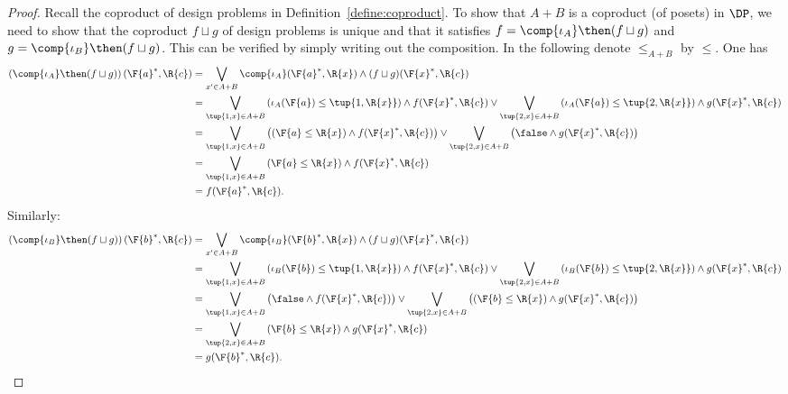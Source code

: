 \begin{proof}
Recall the coproduct of design problems in Definition~\ref{define:coproduct}. To show that $A+B$ is a coproduct (of posets) in $\DP$, we need to show that the coproduct $f \sqcup g$ of design problems is unique and that it satisfies $f = \comp{\iota_A} \then (f \sqcup g)$ and $g = \comp{\iota_B} \then (f \sqcup g)$. This can be verified by simply writing out the composition. In the following denote $\leq_{A+B}$ by $\leq$. One has
\begin{equation}
    \begin{aligned}
    \left(\comp{\iota_A}\then (f\sqcup g)\right)(\F{a}^*,\R{c})&=\bigvee_{x' \in A+B}\comp{\iota_A}(\F{a}^*,\R{x})\wedge (f\sqcup g)(\F{x}^*,\R{c})\\
    &=\bigvee_{\tup{1,x} \in A+B}
    \left(\iota_A(\F{a})\leq\tup{1,\R{x}}\right)\wedge  f(\F{x}^*,\R{c})  \vee \bigvee_{\tup{2,x} \in A+B}
    \left(\iota_A(\F{a})\leq \tup{2,\R{x}}\right)\wedge  g(\F{x}^*,\R{c})\\
    &=\bigvee_{\tup{1,x} \in A+B}
    \left( \left(\F{a}\leq \R{x}\right) \wedge  f(\F{x}^*,\R{c})\right) \vee \bigvee_{\tup{2,x} \in A+B}
    \left( \false \wedge  g(\F{x}^*,\R{c}) \right)\\
    &=\bigvee_{\tup{1,x} \in A+B} \left(\F{a}\leq \R{x}\right) \wedge  f(\F{x}^*,\R{c})\\
    &=f(\F{a}^*,\R{c}).
    \end{aligned}
\end{equation}
Similarly:
\begin{equation}
    \begin{aligned}
    \left(\comp{\iota_B}\then (f\sqcup g)\right)(\F{b}^*,\R{c})&=\bigvee_{x' \in A+B}\comp{\iota_B}(\F{b}^*,\R{x})\wedge (f\sqcup g)(\F{x}^*,\R{c})\\
    &=\bigvee_{\tup{1,x} \in A+B}
    \left(\iota_B(\F{b})\leq\tup{1,\R{x}}\right)\wedge  f(\F{x}^*,\R{c})  \vee \bigvee_{\tup{2,x} \in A+B}
    \left(\iota_B(\F{b})\leq \tup{2,\R{x}}\right)\wedge  g(\F{x}^*,\R{c})\\
    &=\bigvee_{\tup{1,x} \in A+B}
    \left(\false \wedge  f(\F{x}^*,\R{c})\right) \vee \bigvee_{\tup{2,x} \in A+B}
    \left(\left(\F{b}\leq \R{x}\right) \wedge  g(\F{x}^*,\R{c}) \right)\\
    &=\bigvee_{\tup{2,x} \in A+B} \left(\F{b}\leq \R{x}\right) \wedge  g(\F{x}^*,\R{c})\\
    &=g(\F{b}^*,\R{c}).
    \end{aligned}
\end{equation}


\end{proof}
